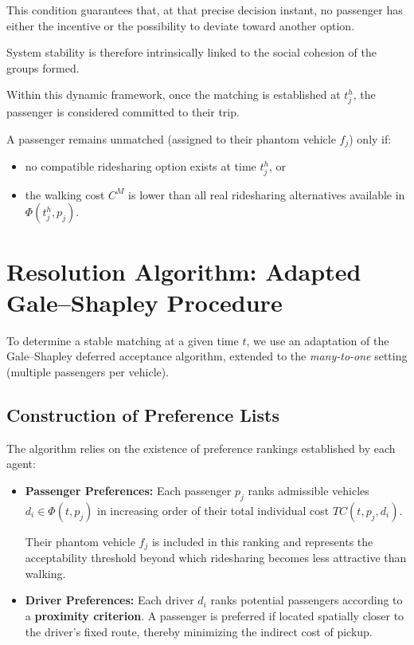 \documentclass[11pt,a4paper]{article}
\begin{document}
This condition guarantees that, at that precise decision instant, no passenger has either the incentive or the possibility to deviate toward another option.

System stability is therefore intrinsically linked to the social cohesion of the groups formed.

Within this dynamic framework, once the matching is established at $t_j^h$, the passenger is considered committed to their trip.

A passenger remains unmatched (assigned to their phantom vehicle $f_j$) only if:

\begin{itemize}
    \item no compatible ridesharing option exists at time $t_j^h$, or

    \item the walking cost $C^M$ is lower than all real ridesharing alternatives available in $\Phi(t_j^h,p_j)$.
\end{itemize}

\section{Resolution Algorithm: Adapted Gale--Shapley Procedure}

To determine a stable matching at a given time $t$, we use an adaptation of the Gale--Shapley deferred acceptance algorithm, extended to the \textit{many-to-one} setting (multiple passengers per vehicle).

\subsection{Construction of Preference Lists}

The algorithm relies on the existence of preference rankings established by each agent:

\begin{itemize}

    \item \textbf{Passenger Preferences:}
    Each passenger $p_j$ ranks admissible vehicles $d_i\in\Phi(t,p_j)$ in increasing order of their total individual cost $TC(t,p_j,d_i)$.

    Their phantom vehicle $f_j$ is included in this ranking and represents the acceptability threshold beyond which ridesharing becomes less attractive than walking.

    \item \textbf{Driver Preferences:}
    Each driver $d_i$ ranks potential passengers according to a \textbf{proximity criterion}. A passenger is preferred if located spatially closer to the driver's fixed route, thereby minimizing the indirect cost of pickup.

\end{itemize}
\end{document}
